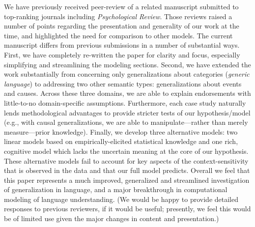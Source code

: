 \documentclass[11pt,letterpaper]{letter} %
\begin{document}
\begin{letter}
We have previously received peer-review of a related manuscript submitted to top-ranking journals including \emph{Psychological Review}.
Those reviews raised a number of points regarding the presentation and generality of our work at the time, and highlighted the need for comparison to other models. 
The current manuscript differs from previous submissions in a number of substantial ways.
First, we have completely re-written the paper for clarity and focus, especially simplifying and streamlining the modeling sections.
Second, we have extended the work substantially from concerning only generalizations about categories (\emph{generic language}) to addressing two other semantic types: generalizations  about events and causes.
Across these three domains, we are able to explain endorsements with little-to-no domain-specific assumptions. 
Furthermore, each case study naturally lends methodological advantages to provide stricter tests of our hypothesis/model (e.g., with causal generalizations, we are able to manipulate---rather than merely measure---prior knowledge).
Finally, we develop three alternative models: two linear models based on empirically-elicited statistical knowledge and one rich, cognitive model which lacks the uncertain meaning at the core of our hypothesis. 
These alternative models fail to account for key aspects of the context-sensitivity that is observed in the data and that our full model predicts.
Overall we feel that this paper represents a much improved, generalized and streamlined investigation of generalization in language, and a major breakthrough in computational modeling of language understanding.
(We would be happy to provide detailed responses to previous reviewers, if it would be useful; presently, we feel this would be of limited use given the major changes in content and presentation.)




\end{letter}
\end{document}
